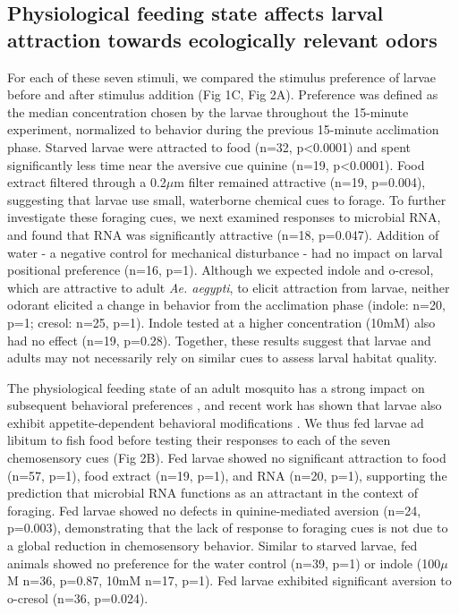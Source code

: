 \subsection*{Physiological feeding state affects larval attraction towards ecologically relevant odors} 
\noindent For each of these seven stimuli, we compared the stimulus preference of larvae before and after stimulus addition (Fig 1C, Fig 2A). Preference was defined as the median concentration chosen by the larvae throughout the 15-minute experiment, normalized to behavior during the previous 15-minute acclimation phase. Starved larvae were attracted to food (n=32, p<0.0001) and spent significantly less time near the aversive cue quinine (n=19, p<0.0001). Food extract filtered through a 0.2${\mu}$m filter remained attractive (n=19, p=0.004), suggesting that larvae use small, waterborne chemical cues to forage. To further investigate these foraging cues, we next examined responses to microbial RNA, and found that RNA was significantly attractive (n=18, p=0.047). Addition of water - a negative control for mechanical disturbance - had no impact on larval positional preference (n=16, p=1). Although we expected indole and o-cresol, which are attractive to adult \textit{Ae. aegypti}, to elicit attraction from larvae, neither odorant elicited a change in behavior from the acclimation phase (indole: n=20, p=1; cresol: n=25, p=1). Indole tested at a higher concentration (10mM) also had no effect (n=19, p=0.28). Together, these results suggest that larvae and adults may not necessarily rely on similar cues to assess larval habitat quality. 

The physiological feeding state of an adult mosquito has a strong impact on subsequent behavioral preferences \cite{Takken2001-lr}, and recent work has shown that larvae also exhibit appetite-dependent behavioral modifications \cite{Kinney2014-wn}. We thus fed larvae ad libitum to fish food before testing their responses to each of the seven chemosensory cues (Fig 2B). Fed larvae showed no significant attraction to food (n=57, p=1), food extract (n=19, p=1), and RNA (n=20, p=1), supporting the prediction that microbial RNA functions as an attractant in the context of foraging. Fed larvae showed no defects in quinine-mediated aversion (n=24, p=0.003), demonstrating that the lack of response to foraging cues is not due to a global reduction in chemosensory behavior. Similar to starved larvae, fed animals showed no preference for the water control (n=39, p=1) or indole (100${\mu}$M n=36, p=0.87, 10mM n=17, p=1). Fed larvae exhibited significant aversion to o-cresol (n=36, p=0.024).

